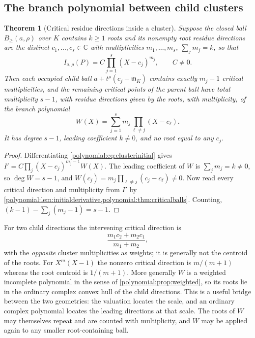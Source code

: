 \documentclass[11pt,letterpaper]{article}
\numberwithin{equation}{section}
\newtheorem{theorem}{Theorem}[section]
\theoremstyle{definition}
\theoremstyle{remark}\newtheorem{remark}[theorem]{Remark}
\newcommand{\C}{\mathbb C}
\newcommand{\mm}{\mathfrak m}
\newcommand{\Bge}[2]{B_{\ge}(#1,#2)}
\begin{document}
\subsection{The branch polynomial between child clusters}
\begin{theorem}[Critical residue directions inside a cluster]
\label{polynomial:thm:branch}
Suppose the closed ball $\Bge a\rho$ over $K$ contains $k\ge1$ roots and its
nonempty root residue directions are the distinct $c_1,\ldots,c_s\in\C$ with
multiplicities $m_1,\ldots,m_s$, $\sum_jm_j=k$, so that
\begin{equation}\label{polynomial:eq:clusterinitial}
 I_{a,\rho}(P)=C\prod_{j=1}^s(X-c_j)^{m_j},\qquad C\ne0 .
\end{equation}
Then each occupied child ball $a+t^\rho(c_j+\mm_K)$ contains exactly $m_j-1$
critical multiplicities, and the remaining critical points of the parent ball
have total multiplicity $s-1$, with residue directions given by the roots,
with multiplicity, of the \emph{branch polynomial}
\begin{equation}\label{polynomial:eq:branchpoly}
 W(X)=\sum_{j=1}^sm_j\prod_{\ell\ne j}(X-c_\ell).
\end{equation}
It has degree $s-1$, leading coefficient $k\ne0$, and no root equal to any
$c_j$.
\end{theorem}
\begin{proof}
Differentiating \eqref{polynomial:eq:clusterinitial} gives
$I'=C\prod_j(X-c_j)^{m_j-1}W(X)$. The leading coefficient of $W$ is
$\sum_jm_j=k\ne0$, so $\deg W=s-1$, and
$W(c_j)=m_j\prod_{\ell\ne j}(c_j-c_\ell)\ne0$. Now read every critical
direction and multiplicity from $I'$ by
\cref{polynomial:lem:initialderivative,polynomial:thm:criticalballs}. Counting,
$(k-1)-\sum_j(m_j-1)=s-1$.
\end{proof}

For two child directions the intervening critical direction is
\[
 \frac{m_1c_2+m_2c_1}{m_1+m_2},
\]
with the \emph{opposite} cluster multiplicities as weights; it is generally
not the centroid of the roots. For $X^m(X-1)$ the nonzero critical direction
is $m/(m+1)$ whereas the root centroid is $1/(m+1)$. More generally $W$ is a
weighted incomplete polynomial in the sense of
\cref{polynomial:prop:weighted}, so its roots lie in the ordinary complex
convex hull of the child directions. This is a useful bridge between the two
geometries: the valuation locates the scale, and an ordinary complex
polynomial locates the leading directions at that scale. The roots of $W$ may
themselves repeat and are counted with multiplicity, and $W$ may be applied
again to any smaller root-containing ball.
\end{document}
